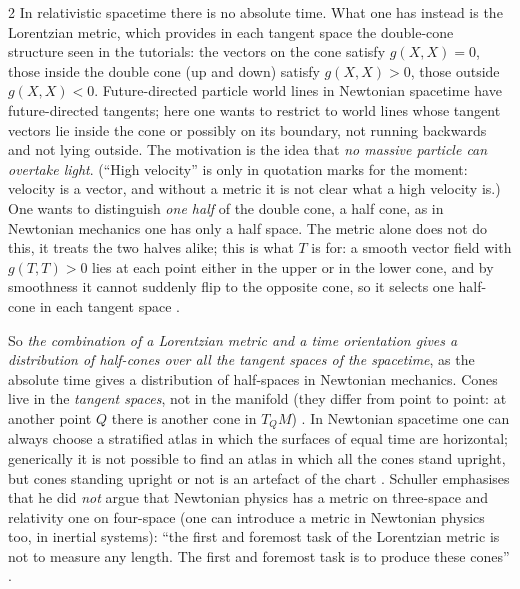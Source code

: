 \begin{paracol}{2}
In relativistic spacetime there is no absolute time. What one has instead is the Lorentzian metric, which provides in each tangent space the double-cone structure seen in the tutorials: the vectors on the cone satisfy $g(X,X)=0$, those inside the double cone (up and down) satisfy $g(X,X)>0$, those outside $g(X,X)<0$. Future-directed particle world lines in Newtonian spacetime have future-directed tangents; here one wants to restrict to world lines whose tangent vectors lie inside the cone or possibly on its boundary, not running backwards and not lying outside. The motivation is the idea that \emph{no massive particle can overtake light}. (``High velocity'' is only in quotation marks for the moment: velocity is a vector, and without a metric it is not clear what a high velocity is.) One wants to distinguish \emph{one half} of the double cone, a half cone, as in Newtonian mechanics one has only a half space. The metric alone does not do this, it treats the two halves alike; this is what $T$ is for: a smooth vector field with $g(T,T)>0$ lies at each point either in the upper or in the lower cone, and by smoothness it cannot suddenly flip to the opposite cone, so it selects one half-cone in each tangent space .

So \emph{the combination of a Lorentzian metric and a time orientation gives a distribution of half-cones over all the tangent spaces of the spacetime}, as the absolute time gives a distribution of half-spaces in Newtonian mechanics. Cones live in the \emph{tangent spaces}, not in the manifold (they differ from point to point: at another point $Q$ there is another cone in $T_QM$) . In Newtonian spacetime one can always choose a stratified atlas in which the surfaces of equal time are horizontal; generically it is not possible to find an atlas in which all the cones stand upright, but cones standing upright or not is an artefact of the chart .
Schuller emphasises that he did \emph{not} argue that Newtonian physics has a metric on three-space and relativity one on four-space (one can introduce a metric in Newtonian physics too, in inertial systems): ``the first and foremost task of the Lorentzian metric is not to measure any length. The first and foremost task is to produce these cones'' .


\end{paracol}
